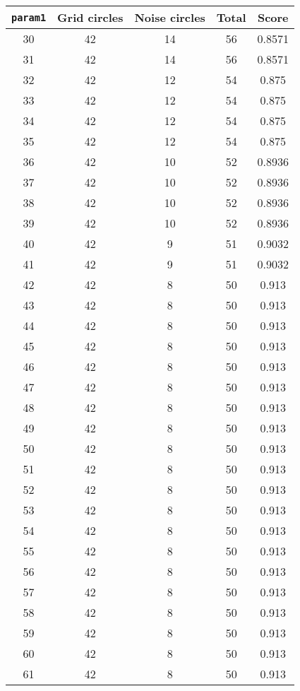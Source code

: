 \documentclass[letterpaper, 12pt]{article}
\begin{document}
\begin{longtable}{|c|c|c|c|c|}
\hline
\textbf{\texttt{param1}} & \textbf{Grid circles} & \textbf{Noise circles} & \textbf{Total} & \textbf{Score} \\
\hline
30 & 42 & 14 & 56 & 0.8571 \\
\hline
31 & 42 & 14 & 56 & 0.8571 \\
\hline
32 & 42 & 12 & 54 & 0.875 \\
\hline
33 & 42 & 12 & 54 & 0.875 \\
\hline
34 & 42 & 12 & 54 & 0.875 \\
\hline
35 & 42 & 12 & 54 & 0.875 \\
\hline
36 & 42 & 10 & 52 & 0.8936 \\
\hline
37 & 42 & 10 & 52 & 0.8936 \\
\hline
38 & 42 & 10 & 52 & 0.8936 \\
\hline
39 & 42 & 10 & 52 & 0.8936 \\
\hline
40 & 42 & 9 & 51 & 0.9032 \\
\hline
41 & 42 & 9 & 51 & 0.9032 \\
\hline
42 & 42 & 8 & 50 & 0.913 \\
\hline
43 & 42 & 8 & 50 & 0.913 \\
\hline
44 & 42 & 8 & 50 & 0.913 \\
\hline
45 & 42 & 8 & 50 & 0.913 \\
\hline
46 & 42 & 8 & 50 & 0.913 \\
\hline
47 & 42 & 8 & 50 & 0.913 \\
\hline
48 & 42 & 8 & 50 & 0.913 \\
\hline
49 & 42 & 8 & 50 & 0.913 \\
\hline
50 & 42 & 8 & 50 & 0.913 \\
\hline
51 & 42 & 8 & 50 & 0.913 \\
\hline
52 & 42 & 8 & 50 & 0.913 \\
\hline
53 & 42 & 8 & 50 & 0.913 \\
\hline
54 & 42 & 8 & 50 & 0.913 \\
\hline
55 & 42 & 8 & 50 & 0.913 \\
\hline
56 & 42 & 8 & 50 & 0.913 \\
\hline
57 & 42 & 8 & 50 & 0.913 \\
\hline
58 & 42 & 8 & 50 & 0.913 \\
\hline
59 & 42 & 8 & 50 & 0.913 \\
\hline
60 & 42 & 8 & 50 & 0.913 \\
\hline
61 & 42 & 8 & 50 & 0.913 \\

\end{longtable}
\end{document}
